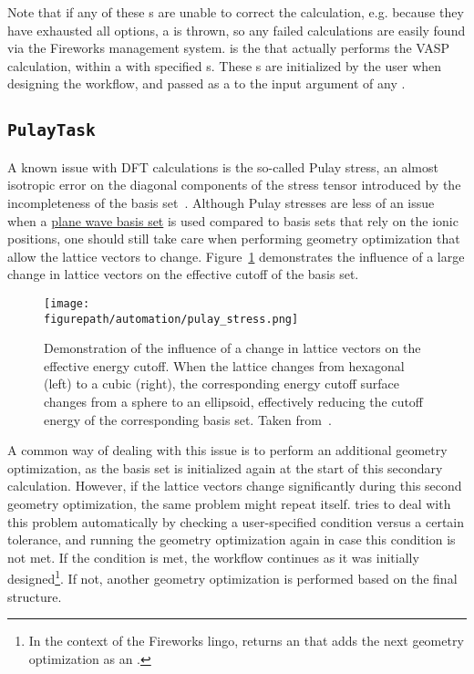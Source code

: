 \begin{refsection}
\begin{itemize}
\end{itemize} 
 
Note that if any of these s are unable to correct the 
calculation, e.g. because they have exhausted all options, a 
 is thrown, so any failed calculations are easily 
found via the Fireworks management system.  is the 
 that actually performs the VASP calculation, within a 
 with specified s. These 
s are initialized by the user when designing the workflow, 
and passed as a  to the  input argument of any 
. 
 
\subsection{\texttt{PulayTask}} \label{automation:sec-PulayTask} 
 
A known issue with DFT calculations is the so-called Pulay stress, an almost 
isotropic error on the diagonal components of the stress tensor introduced by 
the incompleteness of the basis set~\cite{Francis1990}. Although Pulay 
stresses are less of an issue when a \hyperref[dft:sec-basis_set]{plane wave 
basis set} is used compared to basis sets that rely on the ionic positions, 
one should still take care when performing geometry optimization that allow 
the lattice vectors to change. Figure~\ref{automation:fig-pulay} demonstrates 
the influence of a large change in lattice vectors on the effective cutoff of 
the basis set.  
 
\begin{figure} 
\centering 
\texttt{[image: \\figurepath/automation/pulay\_stress.png]} 
\caption{Demonstration of the influence of a change in lattice vectors on the 
effective energy cutoff. When the lattice changes from hexagonal (left) to a 
cubic (right), the corresponding energy cutoff surface changes from a sphere 
to an ellipsoid, effectively reducing the cutoff energy of the corresponding 
basis set. Taken from~\cite{Pulay}.} 
\label{automation:fig-pulay} 
\end{figure} 
 
A common way of dealing with this issue is to perform an additional geometry 
optimization, as the basis set is initialized again at the start of this 
secondary calculation. However, if the lattice vectors change significantly 
during this second geometry optimization, the same problem might repeat 
itself.  tries to deal with this problem automatically by 
checking a user-specified condition versus a certain tolerance, and running 
the geometry optimization again in case this condition is not met. If the 
condition is met, the workflow continues as it was initially 
designed\footnote{In the context of the Fireworks lingo,  
returns an  that adds the next geometry optimization as an 
.}. If not, another geometry optimization is performed based on 
the final structure. 
 

\end{refsection}
